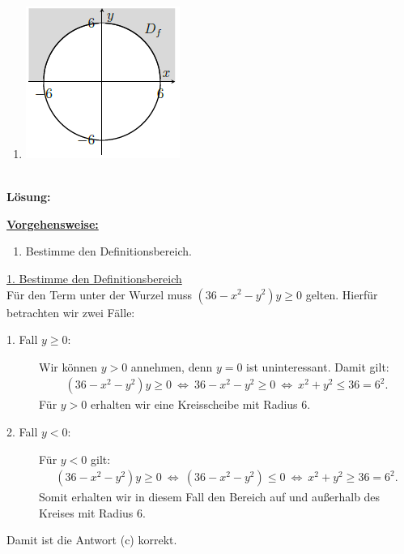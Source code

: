 \begin{enumerate}
\begin{center}
	\end{center}
	\item
	\begin{center}
		\includegraphics[scale=0.6]{pictures/3_4_d}
	\end{center}
\end{enumerate}
\ \\
\textbf{Lösung:}
\begin{mdframed}
\underline{\textbf{Vorgehensweise:}}
\renewcommand{\labelenumi}{\theenumi.}
\begin{enumerate}
\item Bestimme den Definitionsbereich.

\end{enumerate}
\end{mdframed}

\underline{1. Bestimme den Definitionsbereich}\\
Für den Term unter der Wurzel muss $ (36 - x^2 -y^2) y \geq  0 $ gelten.
Hierfür betrachten wir zwei Fälle:
\begin{description}
	\item[1. Fall $ y \geq 0 $:] 
	Wir können $ y > 0  $ annehmen, denn $ y = 0 $ ist uninteressant.
	Damit gilt:
	\begin{align*}
		(36 - x^2 -y^2) y  \geq   0
		\ \Leftrightarrow \ 
		36 - x^2 -y^2   \geq   0
		\ \Leftrightarrow \ 
		x^2 +y^2 \leq 36 = 6^2.
	\end{align*}
	Für $ y > 0  $ erhalten wir eine Kreisscheibe mit Radius $ 6 $.
	
	\item[2. Fall $ y < 0 $:] 
	Für $ y <0  $ gilt:
	\begin{align*}
		(36 - x^2 -y^2) y  \geq   0
		\ \Leftrightarrow \
		(36 - x^2 -y^2) \leq 0
		\ \Leftrightarrow \
		x^2 + y^2 \geq 36 = 6^2.
	\end{align*}
	Somit erhalten wir in diesem Fall den Bereich auf und außerhalb des Kreises mit Radius $ 6 $.
\end{description}
Damit ist die Antwort (c) korrekt.
\newpage

